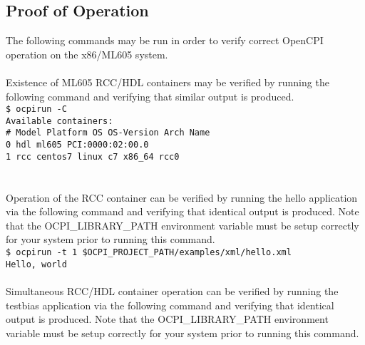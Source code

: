 \documentclass{article}
\newcommand{\terminaloutput}[1]{\texttt{#1}}
\begin{document}
\subsection*{Proof of Operation}
The following commands may be run in order to verify correct OpenCPI operation on the x86/ML605 system.\\ \\
Existence of ML605 RCC/HDL containers may be verified by running the following command and verifying that similar output is produced.\\
\noindent\terminaloutput{\$ ocpirun -C\\
Available containers:\\
 \#  Model\hspace{6ex} Platform\hspace{3ex}    OS\hspace{5ex}     OS-Version\hspace{1ex}  Arch\hspace{3ex} Name\\
 0  hdl\hspace{9ex}   ml605\hspace{39ex} PCI:0000:02:00.0\\
 1  rcc\hspace{9ex}   centos7\hspace{4ex}      linux\hspace{2ex}  c7\hspace{10ex}          x86\_64\hspace{1ex} rcc0\\
}\\ \\
Operation of the RCC container can be verified by running the hello application via the following command and verifying that identical output is produced. Note that the OCPI\_LIBRARY\_PATH environment variable must be setup correctly for your system prior to running this command.\\
\noindent\terminaloutput{\$ ocpirun -t 1 \$OCPI\_PROJECT\_PATH/examples/xml/hello.xml \\
Hello, world} \\ \\
Simultaneous RCC/HDL container operation can be verified by running the testbias application via the following command and verifying that identical output is produced. Note that the OCPI\_LIBRARY\_PATH environment variable must be setup correctly for your system prior to running this command.\\
\end{document}

